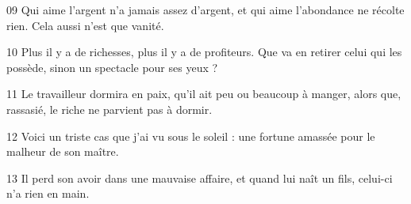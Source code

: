 
09 Qui aime l’argent n’a jamais assez d’argent, et qui aime l’abondance ne récolte rien. Cela aussi n’est que vanité.

10 Plus il y a de richesses, plus il y a de profiteurs. Que va en retirer celui qui les possède, sinon un spectacle pour ses yeux ?

11 Le travailleur dormira en paix, qu’il ait peu ou beaucoup à manger, alors que, rassasié, le riche ne parvient pas à dormir.

12 Voici un triste cas que j’ai vu sous le soleil : une fortune amassée pour le malheur de son maître.

13 Il perd son avoir dans une mauvaise affaire, et quand lui naît un fils, celui-ci n’a rien en main.